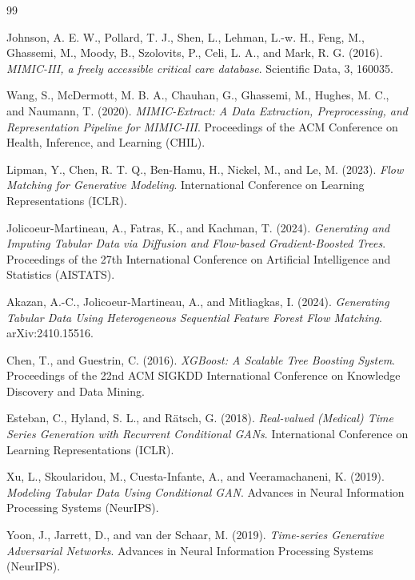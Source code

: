 \documentclass[11pt]{informatics-report}
\begin{document}

\begin{thebibliography}{99}

Johnson, A. E. W., Pollard, T. J., Shen, L., Lehman, L.-w. H., Feng, M., Ghassemi, M.,
Moody, B., Szolovits, P., Celi, L. A., and Mark, R. G. (2016).
\textit{MIMIC-III, a freely accessible critical care database}.
Scientific Data, 3, 160035.

Wang, S., McDermott, M. B. A., Chauhan, G., Ghassemi, M., Hughes, M. C., and Naumann, T. (2020).
\textit{MIMIC-Extract: A Data Extraction, Preprocessing, and Representation Pipeline for MIMIC-III}.
Proceedings of the ACM Conference on Health, Inference, and Learning (CHIL).

Lipman, Y., Chen, R. T. Q., Ben-Hamu, H., Nickel, M., and Le, M. (2023).
\textit{Flow Matching for Generative Modeling}.
International Conference on Learning Representations (ICLR).

Jolicoeur-Martineau, A., Fatras, K., and Kachman, T. (2024).
\textit{Generating and Imputing Tabular Data via Diffusion and Flow-based Gradient-Boosted Trees}.
Proceedings of the 27th International Conference on Artificial Intelligence and Statistics (AISTATS).

Akazan, A.-C., Jolicoeur-Martineau, A., and Mitliagkas, I. (2024).
\textit{Generating Tabular Data Using Heterogeneous Sequential Feature Forest Flow Matching}.
arXiv:2410.15516.

Chen, T., and Guestrin, C. (2016).
\textit{XGBoost: A Scalable Tree Boosting System}.
Proceedings of the 22nd ACM SIGKDD International Conference on Knowledge Discovery and Data Mining.

Esteban, C., Hyland, S. L., and R{\"a}tsch, G. (2018).
\textit{Real-valued (Medical) Time Series Generation with Recurrent Conditional GANs}.
International Conference on Learning Representations (ICLR).

Xu, L., Skoularidou, M., Cuesta-Infante, A., and Veeramachaneni, K. (2019).
\textit{Modeling Tabular Data Using Conditional GAN}.
Advances in Neural Information Processing Systems (NeurIPS).

Yoon, J., Jarrett, D., and van der Schaar, M. (2019).
\textit{Time-series Generative Adversarial Networks}.
Advances in Neural Information Processing Systems (NeurIPS).


\end{thebibliography}
\end{document}
